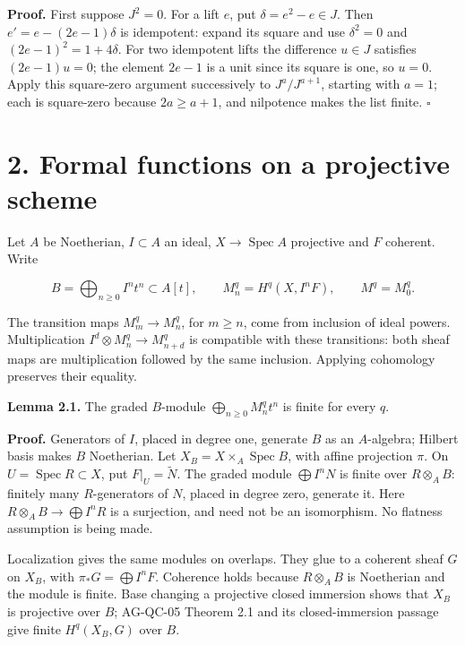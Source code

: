 \documentclass[11pt,a4paper,openany]{report}
\begin{document}
\textbf{Proof.} First suppose \(J^2=0\). For a lift \(e\), put \(\delta=e^2-e\in J\). Then \(e'=e-(2e-1)\delta\) is idempotent: expand its square and use \(\delta^2=0\) and \((2e-1)^2=1+4\delta\). For two idempotent lifts the difference \(u\in J\) satisfies \((2e-1)u=0\); the element \(2e-1\) is a unit since its square is one, so \(u=0\). Apply this square-zero argument successively to \(J^a/J^{a+1}\), starting with \(a=1\); each is square-zero because \(2a\geq a+1\), and nilpotence makes the list finite. \(\square\)

\section{2. Formal functions on a projective scheme}\label{AG-RG-S02-formal-functions-on-a-projective-scheme}

Let \(A\) be Noetherian, \(I\subset A\) an ideal, \(X\to\operatorname{Spec}A\) projective and \(F\) coherent. Write

\[
B=\bigoplus_{n\geq0}I^nt^n\subset A[t],\qquad
M_n^q=H^q(X,I^nF),\qquad M^q=M_0^q.
\]

The transition maps \(M_m^q\to M_n^q\), for \(m\geq n\), come from inclusion of ideal powers. Multiplication \(I^d\otimes M_n^q\to M_{n+d}^q\) is compatible with these transitions: both sheaf maps are multiplication followed by the same inclusion. Applying cohomology preserves their equality.

\textbf{Lemma 2.1.} The graded \(B\)-module \(\bigoplus_{n\geq0}M_n^qt^n\) is finite for every \(q\).

\textbf{Proof.} Generators of \(I\), placed in degree one, generate \(B\) as an \(A\)-algebra; Hilbert basis makes \(B\) Noetherian. Let \(X_B=X\times_A\operatorname{Spec}B\), with affine projection \(\pi\). On \(U=\operatorname{Spec}R\subset X\), put \(F|_U=\widetilde N\). The graded module \(\bigoplus I^nN\) is finite over \(R\otimes_AB\): finitely many \(R\)-generators of \(N\), placed in degree zero, generate it. Here \(R\otimes_AB\to\bigoplus I^nR\) is a surjection, and need not be an isomorphism. No flatness assumption is being made.

Localization gives the same modules on overlaps. They glue to a coherent sheaf \(G\) on \(X_B\), with \(\pi_*G=\bigoplus I^nF\). Coherence holds because \(R\otimes_AB\) is Noetherian and the module is finite. Base changing a projective closed immersion shows that \(X_B\) is projective over \(B\); AG-QC-05 Theorem 2.1 and its closed-immersion passage give finite \(H^q(X_B,G)\) over \(B\).
\end{document}

